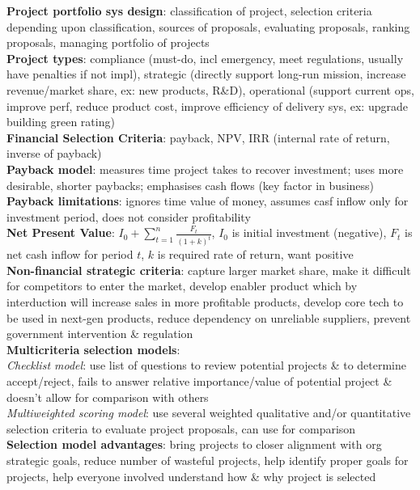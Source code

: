 \documentclass[a4paper]{article}
\begin{document}
\begin{multicols}{2}
        \textbf{Project portfolio sys design}: classification of project, selection criteria depending upon classification, sources of proposals, evaluating proposals, ranking proposals, managing portfolio of projects\\
        \textbf{Project types}: compliance (must-do, incl emergency, meet regulations, usually have penalties if not impl), strategic (directly support long-run mission, increase revenue/market share, ex: new products, R\&D), operational (support current ops, improve perf, reduce product cost, improve efficiency of delivery sys, ex: upgrade building green rating)\\
        \textbf{Financial Selection Criteria}: payback, NPV, IRR (internal rate of return, inverse of payback)\\
        \textbf{Payback model}: measures time project takes to recover investment; uses more desirable, shorter paybacks; emphasises cash flows (key factor in business)\\
        \textbf{Payback limitations}: ignores time value of money, assumes casf inflow only for investment period, does not consider profitability\\
        \textbf{Net Present Value}: $I_0 + \sum\nolimits_{t=1}^n\frac{F_t}{{(1 + k)}^t}$, $I_0$ is initial investment (negative), $F_t$ is net cash inflow for period $t$, $k$ is required rate of return, want positive\\
        \textbf{Non-financial strategic criteria}: capture larger market share, make it difficult for competitors to enter the market, develop enabler product which by interduction will increase sales in more profitable products, develop core tech to be used in next-gen products, reduce dependency on unreliable suppliers, prevent government intervention \& regulation\\
        \textbf{Multicriteria selection models}:\\
        \textit{Checklist model}: use list of questions to review potential projects \& to determine accept/reject, fails to answer relative importance/value of potential project \& doesn't allow for comparison with others\\
        \textit{Multiweighted scoring model}: use several weighted qualitative and/or quantitative selection criteria to evaluate project proposals, can use for comparison\\
        \textbf{Selection model advantages}: bring projects to closer alignment with org strategic goals, reduce number of wasteful projects, help identify proper goals for projects, help everyone involved understand how \& why project is selected\\

\end{multicols}
\end{document}
